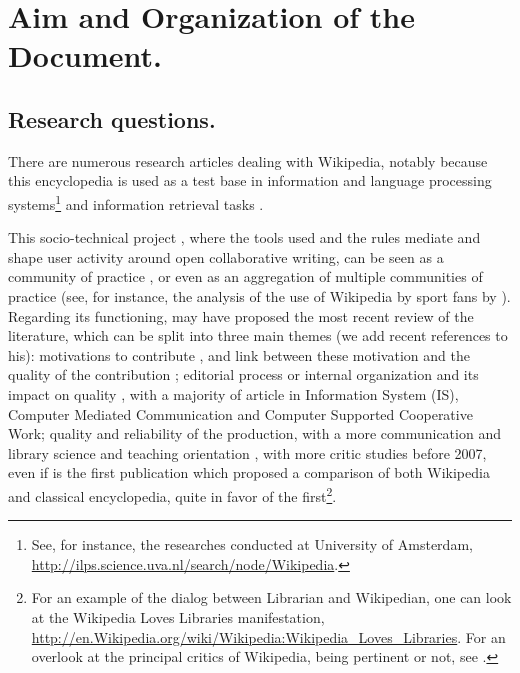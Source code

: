 
\section{Aim and Organization of the Document.}

\subsection{Research questions.}

There are numerous research articles dealing with Wikipedia, notably
because this encyclopedia is used as a test base in information and
language processing systems\footnote{See, for instance, the researches conducted at University of Amsterdam,
\url{http://ilps.science.uva.nl/search/node/Wikipedia}.} and information retrieval tasks \citep{Burioletal06}.

This socio-technical project \citep{Bryantetal05,BenkerNissenbaum06},
where the tools used and the rules mediate and shape user activity
around open collaborative writing, can be seen as a community of practice
\citep{HaraShachafHew10}, or even as an aggregation of multiple communities
of practice (see, for instance, the analysis of the use of Wikipedia
by sport fans by \citealp{Ferriter09}). Regarding its functioning,
\citet{Okoli09,Park11,Okolietal12} may have proposed the most recent
review of the literature, which can be split into three main themes
(we add recent references to his): motivations to contribute \citep{Nov07},
and link between these motivation and the quality of the contribution
\citep{GlottSchmidtGhosh10b}; editorial process or internal organization
\citep{BestenDalle08,BrandesLerner08,Freardetal10,Kitturetal07a,Kitturetal07b,Ortega07}
and its impact on quality \citep{Viegasetal07,ViegasWattenbergMcKeon07,OkoliOh07,Stviliaetal08,CarilloOkoli11},
with a majority of article in Information System (IS), Computer Mediated
Communication and Computer Supported Cooperative Work; quality and
reliability of the production, with a more communication and library
science \citep{Denningetal05,Magnus06,Svoboda06,Gorman07,Waters07,Fallis08,Dede08,Fiedler08,Eijkman08,Rector08,SantanaWood09,WestWilliamson09,RoyalKapila09,Chen10}
and teaching orientation \citep{Callisetal09,Haigh11}, with more
critic studies before 2007, even if \citet{Giles05} is the first
publication which proposed a comparison of both Wikipedia and classical
encyclopedia, quite in favor of the first\footnote{For an example of the dialog between Librarian and Wikipedian, one
can look at the Wikipedia Loves Libraries manifestation, \url{http://en.Wikipedia.org/wiki/Wikipedia:Wikipedia_Loves_Libraries}.
For an overlook at the principal critics of Wikipedia, being pertinent
or not, see \citet{ONeil10}. }.

